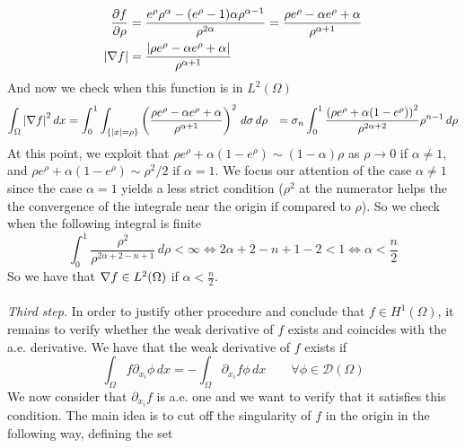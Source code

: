 \begin{align*}
\frac{\partial f}{\partial \rho} &= \frac{e^\rho \rho^\alpha - (e^\rho - 1) \alpha \rho^{\alpha-1}}{\rho^{2\alpha}} = \frac{\rho e^\rho - \alpha e^\rho + \alpha}{\rho^{\alpha+1}}\\
\abs{\nabla f} &= \frac{\abs{\rho e^{\rho} - \alpha e^{\rho} + \alpha}}{\rho^{\alpha + 1}}
\end{align*}
And now we check when this function is in \(L^2(\Omega)\)
\begin{align*}
\int_\Omega \abs{\nabla f}^2 \, dx &= \int_0^1 \int_{\left\{\abs{x} = \rho\right\}} \left(\frac{\rho e^{\rho} - \alpha e^{\rho} + \alpha}{\rho^{\alpha + 1}}\right)^2 \, d\sigma \, d\rho 
                                  &= \sigma_n \int_0^1 \frac{\left(\rho e^{\rho} + \alpha (1 - e^{\rho})\right)^2}{\rho^{2\alpha + 2}} \rho^{n-1} \, d\rho \\
\end{align*}
At this point, we exploit that $\rho e^{\rho} + \alpha (1 - e^{\rho}) \sim (1-\alpha)\rho$ as $\rho \to 0$ if $\alpha \neq 1$, and $\rho e^{\rho} + \alpha (1 - e^{\rho}) \sim \rho^2/2$ if $\alpha = 1$. 
We focus our attention of the case \(\alpha \neq 1\) since the case \(\alpha = 1\) yields a less strict condition 
($\rho^2$ at the numerator helps the the convergence of the integrale near the origin if compared to $\rho$).
So we check when the following integral is finite
\begin{equation*}
\int_0^1 \frac{\rho^2}{\rho^{2\alpha + 2 - n + 1}} \, d\rho < \infty \iff 2\alpha + 2 - n + 1 - 2 < 1 \iff \alpha < \frac{n}{2}
\end{equation*}
So we have that \(\nabla f \in L^2(\Omega)\) if \(\alpha < \frac{n}{2}\).\\
\vspace{0.1cm}\\
\textit{Third step.} In order to justify other procedure and conclude that $f \in H^1(\Omega)$, 
it remains to verify whether the weak derivative of \(f\) exists and coincides with the a.e. derivative.
We have that the weak derivative of \(f\) exists if
\begin{equation}\label{eq:weak_derivative}
\int_\Omega f \partial_{x_i} \phi \, dx = - \int_\Omega \partial_{x_i} f \phi \, dx \qquad \forall \phi \in \mathcal{D}(\Omega)
\end{equation}
We now consider that $\partial_{x_i} f$ is a.e. one and we want to verify that it satisfies this condition. 
The main idea is to cut off the singularity of \(f\) in the origin in the following way, defining the set
